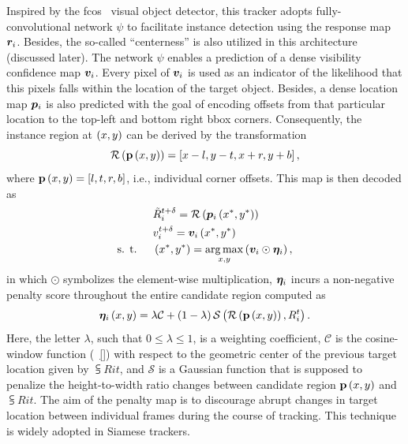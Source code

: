 Inspired by the \gls{fcos}~\cite{tian2019fcos} visual object detector, this tracker adopts fully-convolutional network $\psi$ to facilitate instance detection using the response map $\bm{r}_{i}$. Besides, the so-called ``centerness'' is also utilized in this architecture (discussed later). The network $\psi$ enables a prediction of a dense visibility confidence map $\bm{v}_{i}$. Every pixel of $\bm{v}_{i}$ is used as an indicator of the likelihood that this pixels falls within the location of the target object. Besides, a dense location map $\bm{p}_{i}$ is also predicted with the goal of encoding offsets from that particular location to the top-left and bottom right \gls{bbox} corners. Consequently, the instance region at $\left( {x, y} \right)$ can be derived by the transformation
\begin{equation}
    {\mathcal{R}} \left( {\mathbf{p}} \left( x, y \right) \right) =
    \left[ {x - l, y - t, x + r, y + b} \right],
\end{equation}
where ${\mathbf{p}} \left( x, y \right) = \left[ {l, t, r, b} \right]$, i.e., individual corner offsets. This map is then decoded as
\begin{equation}
    \begin{aligned}
                            & {\tilde{R}}_{i}^{t + \delta} =
        {\mathcal{R}} \left( {\bm{p}_{i}} \left( x^*, y^* \right) \right)                                                                      \\
                            & {v}_{i}^{t + \delta} = {\bm{v}_{i}} \left( x^*, y^* \right)                                        \\
        \text{s. t. } \quad & \left( {x^*, y^*} \right) = \underset{x, y}{\operatorname*{arg\,max}} \left( {\bm{v}_{i} \odot \bm{\eta}_{i}} \right),
    \end{aligned}
\end{equation}
in which $\odot$ symbolizes the element-wise multiplication, $\bm{\eta}_{i}$ incurs a non-negative penalty score throughout the entire candidate region computed as
\begin{equation}
    {\bm{\eta}_{i}} \left( x, y \right) =
    \lambda \mathcal{C} +
    \left( {1 - \lambda} \right) {\mathcal{S}} \left( 
        {\mathcal{R}} \left( 
            {\mathbf{p}} \left( x, y \right)
         \right),
        {R}_{i}^{t}
     \right).
\end{equation}
Here, the letter $\lambda$, such that $0 \leq \lambda \leq 1$, is a weighting coefficient, $\mathcal{C}$ is the cosine-window function (\sectionstr{}~\ref{}) with respect to the geometric center of the previous target location given by $\subsup{R}{i}{t}$, and $\mathcal{S}$ is a Gaussian function that is supposed to penalize the height-to-width ratio changes between candidate region ${\mathbf{p}} \left( x, y \right)$ and $\subsup{R}{i}{t}$. The aim of the penalty map is to discourage abrupt changes in target location between individual frames during the course of tracking. This technique is widely adopted in Siamese trackers.

